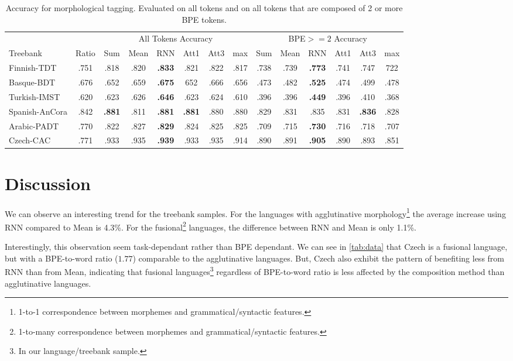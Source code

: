 \documentclass[11pt]{article}
\begin{document}
		\begin{table}[h]
		\small
		\centering
		\begin{tabular}{l|c|cccccc||cccccc}
			& &  \multicolumn{6}{c}{All Tokens Accuracy} & \multicolumn{6}{c}{BPE$>=2$ Accuracy} \\
			Treebank & Ratio & Sum & Mean & RNN & Att1 & Att3 & max & Sum & Mean & RNN & Att1 & Att3 & max \\
			\hline
			Finnish-TDT & .751 & .818 & .820 & \textbf{.833} & .821 & .822 & .817 & .738 & .739 & \textbf{.773} & .741 & .747 & 722 \\ 
			Basque-BDT & .676 & .652 & .659 & \textbf{.675} & 652 & .666 & .656 & .473 & .482 & \textbf{.525} & .474 & .499 & .478 \\
			Turkish-IMST & .620 & .623 & .626 & \textbf{.646} & .623 & .624 & .610 & .396 & .396 & \textbf{.449} & .396 & .410 & .368\\
			Spanish-AnCora & .842 & \textbf{.881} & .811 & \textbf{.881} & \textbf{.881} & .880 & .880 & .829 & .831 & .835 & .831 & \textbf{.836} & .828\\
			Arabic-PADT & .770 & .822 & .827&\textbf{.829}&.824&.825&.825&.709&.715&\textbf{.730}&.716&.718&.707\\
			Czech-CAC & .771 &.933 & .935 & \textbf{.939} & .933 & .935 &.914& .890 & .891 & \textbf{.905} & .890 & .893&.851\\
			
		\end{tabular}
		\caption{\label{tab:results} Accuracy for morphological tagging. Evaluated on all tokens and on all tokens that are composed of 2 or more BPE tokens.}
	\end{table}



	
	
	\section{Discussion}
        We can observe an interesting trend for the treebank samples. For the languages with agglutinative morphology\footnote{1-to-1 correspondence between morphemes and grammatical/syntactic features.} the average increase using RNN compared to Mean is 4.3\%. For the fusional\footnote{1-to-many correspondence between morphemes and grammatical/syntactic features.} languages, the difference between RNN and Mean is only 1.1\%. 
        
        Interestingly, this observation seem task-dependant rather than BPE dependant. We can see in \cref{tab:data} that Czech is a fusional language, but with a BPE-to-word ratio ($1.77$) comparable to the agglutinative languages. But, Czech also exhibit the pattern of benefiting less from RNN than from Mean, indicating that fusional languages\footnote{In our language/treebank sample.} regardless of BPE-to-word ratio is less affected by the composition method than agglutinative languages. 
        
\end{document}
